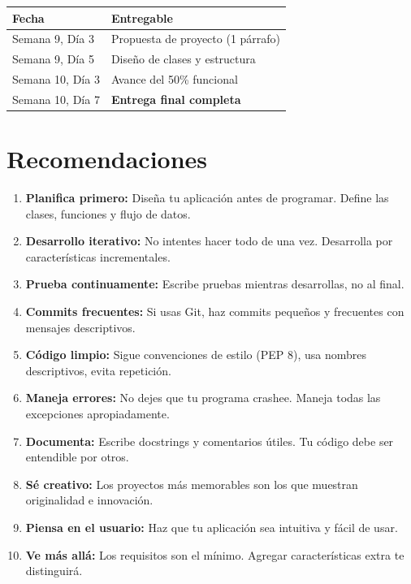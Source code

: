 \documentclass[12pt,a4paper]{article}
\begin{document}
\begin{center}
\begin{tabular}{|l|l|}
\hline
\textbf{Fecha} & \textbf{Entregable} \\
\hline
Semana 9, Día 3 & Propuesta de proyecto (1 párrafo) \\
Semana 9, Día 5 & Diseño de clases y estructura \\
Semana 10, Día 3 & Avance del 50\% funcional \\
Semana 10, Día 7 & \textbf{Entrega final completa} \\
\hline
\end{tabular}
\end{center}

\section{Recomendaciones}

\begin{enumerate}
    \item \textbf{Planifica primero:} Diseña tu aplicación antes de programar. Define las clases, funciones y flujo de datos.
    
    \item \textbf{Desarrollo iterativo:} No intentes hacer todo de una vez. Desarrolla por características incrementales.
    
    \item \textbf{Prueba continuamente:} Escribe pruebas mientras desarrollas, no al final.
    
    \item \textbf{Commits frecuentes:} Si usas Git, haz commits pequeños y frecuentes con mensajes descriptivos.
    
    \item \textbf{Código limpio:} Sigue convenciones de estilo (PEP 8), usa nombres descriptivos, evita repetición.
    
    \item \textbf{Maneja errores:} No dejes que tu programa crashee. Maneja todas las excepciones apropiadamente.
    
    \item \textbf{Documenta:} Escribe docstrings y comentarios útiles. Tu código debe ser entendible por otros.
    
    \item \textbf{Sé creativo:} Los proyectos más memorables son los que muestran originalidad e innovación.
    
    \item \textbf{Piensa en el usuario:} Haz que tu aplicación sea intuitiva y fácil de usar.
    
    \item \textbf{Ve más allá:} Los requisitos son el mínimo. Agregar características extra te distinguirá.
\end{enumerate}
\end{document}
